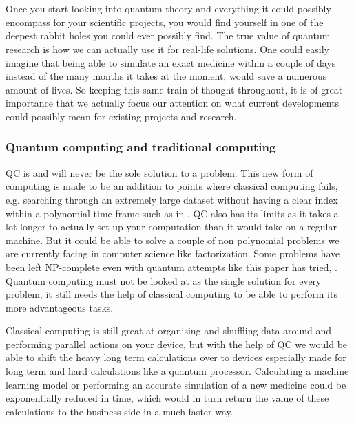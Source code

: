 
\chapter{}
\label{ch:computing-with-quantum}

Once you start looking into quantum theory and everything it could possibly encompass for your scientific projects, you would find yourself in one of the deepest rabbit holes you could ever possibly find. The true value of quantum research is how we can actually use it for real-life solutions. One could easily imagine that being able to simulate an exact medicine within a couple of days instead of the many months it takes at the moment, would save a numerous amount of lives. So keeping this same train of thought throughout, it is of great importance that we actually focus our attention on what current developments could possibly mean for existing projects and research.

\subsection{Quantum computing and traditional computing}

QC is and will never be the sole solution to a problem. This new form of computing is made to be an addition to points where classical computing fails, e.g. searching through an extremely large dataset without having a clear index within a polynomial time frame such as in \textcite{Terhal1998}. QC also has its limits as it takes a lot longer to actually set up your computation than it would take on a regular machine. But it could be able to solve a couple of non polynomial problems we are currently facing in computer science like factorization. 
Some problems have been left NP-complete even with quantum attempts like this paper has tried, \textcite{Wang2007}. Quantum computing must not be looked at as the single solution for every problem, it still needs the help of classical computing to be able to perform its more advantageous tasks. 

Classical computing is still great at organising and shuffling data around and performing parallel actions on your device, but with the help of QC we would be able to shift the heavy long term calculations over to devices especially made for long term and hard calculations like a quantum processor. Calculating a machine learning model \textcite{Schuld2014} or performing an accurate simulation of a new medicine could be exponentially reduced in time, which would in turn return the value of these calculations to the business side in a much faster way. \autocite{Schuld2015} \autocite{Troyer2005}

